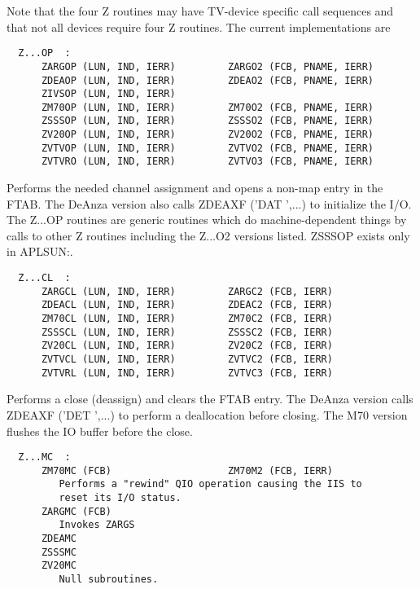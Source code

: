 Note that the four Z routines may have TV-device specific call
sequences and that not all devices require four Z routines.  The
current implementations are
\begin{verbatim}
  Z...OP  :
      ZARGOP (LUN, IND, IERR)         ZARGO2 (FCB, PNAME, IERR)
      ZDEAOP (LUN, IND, IERR)         ZDEAO2 (FCB, PNAME, IERR)
      ZIVSOP (LUN, IND, IERR)
      ZM70OP (LUN, IND, IERR)         ZM70O2 (FCB, PNAME, IERR)
      ZSSSOP (LUN, IND, IERR)         ZSSSO2 (FCB, PNAME, IERR)
      ZV20OP (LUN, IND, IERR)         ZV20O2 (FCB, PNAME, IERR)
      ZVTVOP (LUN, IND, IERR)         ZVTVO2 (FCB, PNAME, IERR)
      ZVTVRO (LUN, IND, IERR)         ZVTVO3 (FCB, PNAME, IERR)
\end{verbatim}
Performs the needed channel assignment and opens a non-map
entry in the FTAB.  The DeAnza version also calls
ZDEAXF ('DAT ',...) to initialize the I/O. The Z...OP
routines are generic routines which do machine-dependent
things by calls to other Z routines including the Z...O2
versions listed.  ZSSSOP exists only in APLSUN:.
\begin{verbatim}
  Z...CL  :
      ZARGCL (LUN, IND, IERR)         ZARGC2 (FCB, IERR)
      ZDEACL (LUN, IND, IERR)         ZDEAC2 (FCB, IERR)
      ZM70CL (LUN, IND, IERR)         ZM70C2 (FCB, IERR)
      ZSSSCL (LUN, IND, IERR)         ZSSSC2 (FCB, IERR)
      ZV20CL (LUN, IND, IERR)         ZV20C2 (FCB, IERR)
      ZVTVCL (LUN, IND, IERR)         ZVTVC2 (FCB, IERR)
      ZVTVRL (LUN, IND, IERR)         ZVTVC3 (FCB, IERR)
\end{verbatim}
Performs a close (deassign) and clears the FTAB entry.  The
DeAnza version calls ZDEAXF ('DET ',...) to perform a
deallocation before closing.  The M70 version flushes the
IO buffer before the close.
\begin{verbatim}
  Z...MC  :
      ZM70MC (FCB)                    ZM70M2 (FCB, IERR)
         Performs a "rewind" QIO operation causing the IIS to
         reset its I/O status.
      ZARGMC (FCB)
         Invokes ZARGS
      ZDEAMC
      ZSSSMC
      ZV20MC
         Null subroutines.
\end{verbatim}
